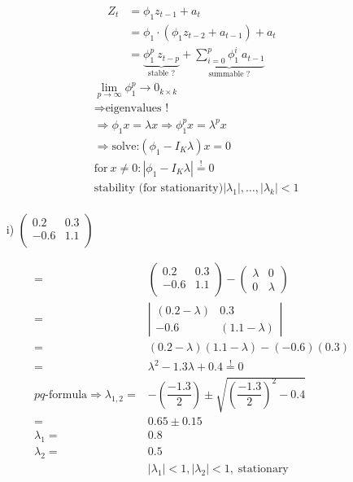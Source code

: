 \documentclass[12pt,a4paper]{article}
\begin{document}
\begin{align*}
  Z_t & = \phi_1 z_{t-1} + a_t\\
  & = \phi_1 \cdot(\phi_1 z_{t-2} + a_{t-1}) + a_t \\
    & = \underbrace{ \phi_1^p \ z_{t-p}}_{\text{stable ?}} + \underbrace{\sum_{i = 0}^{p} \phi_1^{i} \ a_{t -1} }_{\text{summable ?}}
\end{align*} \begin{align*}
  & \lim_{p \rightarrow \infty} \phi_1^p \longrightarrow 0_{k \times k} \\
  & \Rightarrow \text{eigenvalues !} \\
  & \Rightarrow \phi_1 x = \lambda x \Rightarrow \phi_1^{p} x = \lambda^p x\\
  & \Rightarrow \text{solve:} \left( \phi_1 - I_K \lambda \right) x = 0\\
  & \text{for} \ x \neq 0: \left| \phi_1 - I_K \lambda \right| \overset{!}{=} 0 \\
  & \text{stability (for stationarity)}  \left| \lambda_1 \right|, \ldots,  \left| \lambda_k \right| < 1 \\
\end{align*}

\begin{itemize} 
    \item[i)] $\begin{pmatrix}
        0.2 & 0.3 \\ 
        -0.6 & 1.1 \\
      \end{pmatrix} $
\end{itemize}

\begin{align*}
   = & \begin{pmatrix}
        0.2 & 0.3 \\ 
        -0.6 & 1.1 \\
      \end{pmatrix} - 
      \begin{pmatrix}
       \lambda & 0 \\ 
       0 & \lambda
      \end{pmatrix}\\
      = &  
      \left|
      \begin{matrix}
      (0.2 - \lambda) & 0.3 \\ 
        -0.6 & (1.1 - \lambda)
      \end{matrix}
      \right| \\
      = & (0.2 -\lambda)(1.1 - \lambda) - (-0.6) (0.3)\\
      = & \lambda^2 - 1.3 \lambda + 0.4 \overset{!}{=} 0 \\
      pq \text{-formula} \Rightarrow  \lambda_{1,2} = & - \left( \dfrac{-1.3}{2} \right) \pm \sqrt{ \left( \dfrac{-1.3}{2} \right)^2 - 0.4 }\\
       = & 0.65 \pm 0.15 \\
      \lambda_1 = & 0.8 \\
      \lambda_2 = & 0.5 \\
      & |\lambda_1| < 1 , |\lambda_2| < 1,  \; \text{stationary}
\end{align*}
\end{document}
